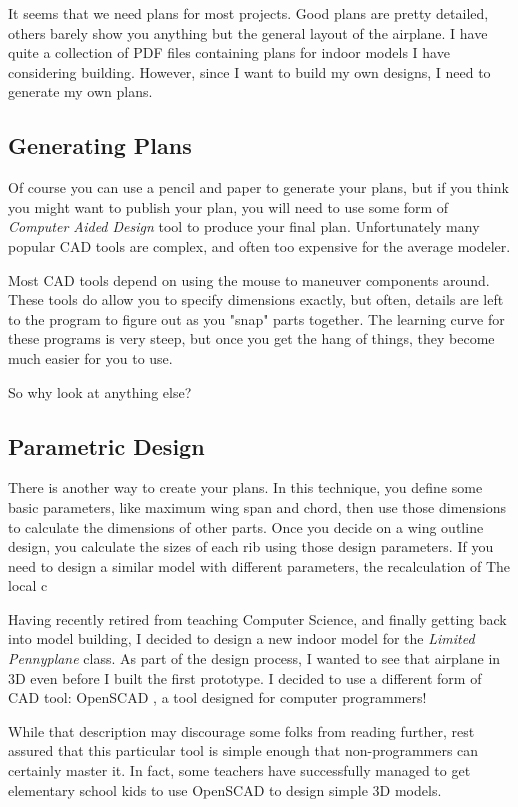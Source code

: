 It seems that we need plans for most projects. Good plans are pretty detailed,
others barely show you anything but the general layout of the airplane. I have
quite a collection of PDF files containing plans for indoor models I have
considering building.  However, since I want to build my own designs, I need to
generate my own plans.

\subsection{Generating Plans}

Of course you can use a pencil and paper to generate your plans, but if you
think you might want to publish your plan, you will need to use some form of
{\it Computer Aided Design} tool to produce your final plan. Unfortunately many
popular CAD tools are complex, and often too expensive for the average modeler.

Most CAD tools depend on using the mouse to maneuver components around. These
tools do allow you to specify dimensions exactly, but often, details are left
to the program to figure out as you "snap" parts together. The learning curve
for these programs is very steep, but once you get the hang of things, they
become much easier for you to use.

So why look at anything else?

\subsection{Parametric Design}

There is another way to create your plans. In this technique, you define some
basic parameters, like maximum wing span and chord, then use those dimensions
to calculate the dimensions of other parts.  Once you decide on a wing outline
design, you calculate the sizes of each rib using those design parameters. If
you need to design a similar model with different parameters, the recalculation
of The local c

Having recently retired from teaching Computer Science, and
finally getting back into model building, I decided to design a new indoor
model for the {\it Limited Pennyplane} class. As part of the design process, I
wanted to see that airplane in 3D even before I built the first prototype. I
decided to use a different form of CAD tool: OpenSCAD \cite{openscad}, a tool
designed for computer programmers!

While that description may discourage some folks from reading further, rest
assured that this particular tool is simple enough that non-programmers can
certainly master it. In fact, some teachers have successfully managed to get
elementary school kids to use OpenSCAD to design simple 3D models.

